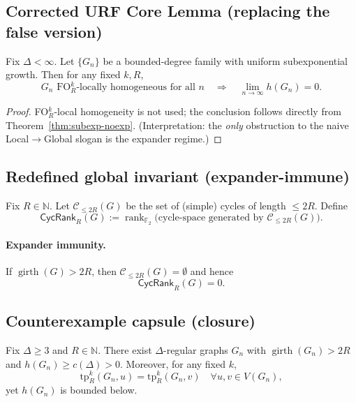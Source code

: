 \subsection{Corrected URF Core Lemma (replacing the false version)}
\begin{lemma}\label{lem:urf-core-lg-corrected}
Fix $\Delta<\infty$. Let $\{G_n\}$ be a bounded-degree family with uniform subexponential growth.
Then for any fixed $k,R$,
\[
\text{$G_n$ FO$^k_R$-locally homogeneous for all $n$}
\quad\Longrightarrow\quad
\lim_{n\to\infty} h(G_n)=0.
\]
\end{lemma}

\begin{proof}
FO$^k_R$-local homogeneity is not used; the conclusion follows directly from Theorem~\ref{thm:subexp-noexp}.
(Interpretation: the \emph{only} obstruction to the naive Local$\to$Global slogan is the expander regime.)
\end{proof}

\subsection{Redefined global invariant (expander-immune)}
\begin{definition}
Fix $R\in\mathbb N$.
Let $\mathcal C_{\le 2R}(G)$ be the set of (simple) cycles of length $\le 2R$.
Define
\[
\mathsf{CycRank}_R(G):=\operatorname{rank}_{\mathbb F_2}\Big(\text{cycle-space generated by }\mathcal C_{\le 2R}(G)\Big).
\]
\end{definition}

\paragraph{Expander immunity.}
If $\operatorname{girth}(G)>2R$, then $\mathcal C_{\le 2R}(G)=\emptyset$ and hence
\[
\mathsf{CycRank}_R(G)=0.
\]

\subsection{Counterexample capsule (closure)}
\begin{proposition}\label{prop:counterexample}
Fix $\Delta\ge 3$ and $R\in\mathbb N$.
There exist $\Delta$-regular graphs $G_n$ with $\operatorname{girth}(G_n)>2R$ and $h(G_n)\ge c(\Delta)>0$.
Moreover, for any fixed $k$,
\[
\mathrm{tp}^{k}_R(G_n,u)=\mathrm{tp}^{k}_R(G_n,v)\quad\forall u,v\in V(G_n),
\]
yet $h(G_n)$ is bounded below.
\end{proposition}
